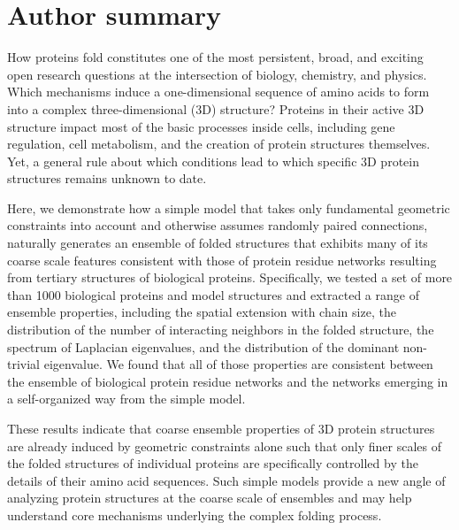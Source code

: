 \documentclass[9pt]{elife}
\begin{document}
\maketitle
\section{Author summary}
How proteins fold constitutes one of the most persistent, broad, and exciting open research questions at the intersection of biology, chemistry, and physics. Which mechanisms induce a one-dimensional sequence of amino acids to form into a complex three-dimensional (3D) structure? Proteins in their active 3D structure impact most of the basic processes inside cells, including gene regulation, cell metabolism, and the creation of protein structures themselves. Yet, a general rule about which conditions lead to which specific 3D protein structures remains unknown to date.

Here, we demonstrate how a simple model that takes only fundamental geometric constraints into account and otherwise assumes randomly paired connections, naturally generates an ensemble of folded structures that exhibits many of its coarse scale features consistent with those of protein residue networks resulting from tertiary structures of biological proteins. Specifically, we tested a set of more than 1000 biological proteins and model structures and extracted a range of ensemble properties, including the spatial extension with chain size, the distribution of the number of interacting neighbors in the folded structure, the spectrum of Laplacian eigenvalues, and the distribution of the dominant non-trivial eigenvalue. We found that all of those properties are consistent between the ensemble of biological protein residue networks and the networks emerging in a self-organized way from the simple model.

These results indicate that coarse ensemble properties of 3D protein structures are already induced by geometric constraints alone such that only finer scales of the folded structures of individual proteins are specifically controlled by the details of their amino acid sequences. Such simple models provide a new angle of analyzing protein structures at the coarse scale of ensembles and may help understand core mechanisms underlying the complex folding process. 
\end{document}
